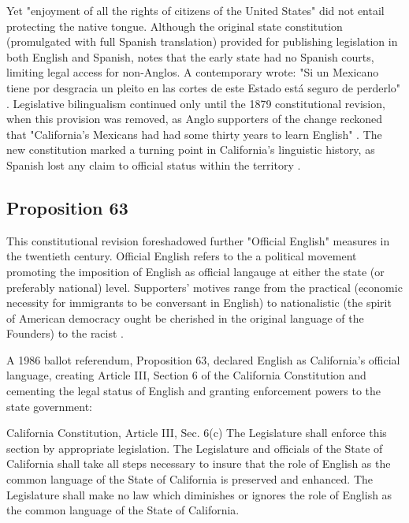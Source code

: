 Yet "enjoyment of all the rights of citizens of the United States" did not
entail protecting the native tongue. Although the original state constitution
(promulgated with full Spanish translation) provided for publishing legislation
in both English and Spanish, \textcite{lamar-prieto14} notes that the early
state had no Spanish courts, limiting legal access for non-Anglos. A
contemporary wrote: "Si un Mexicano tiene por desgracia un pleito en las cortes
de este Estado está seguro de perderlo" \parencite[28]{lamar-prieto14}.
Legislative bilingualism continued only until the 1879 constitutional revision,
when this provision was removed, as Anglo supporters of the change reckoned that
"California's Mexicans had had some thirty years to learn English"
\parencite{baron92}. The new constitution marked a turning point in California's
linguistic history, as Spanish lost any claim to official status within the
territory \parencite{baron92}.

\subsection{Proposition 63}

This constitutional revision foreshadowed further "Official English" measures in
the twentieth century. Official English refers to the a political movement
promoting the imposition of English as official langauge at either the state (or
preferably national) level. Supporters' motives range from the practical
(economic necessity for immigrants to be conversant in English) to nationalistic
(the spirit of American democracy ought be cherished in the original language of
the Founders) to the racist \parencite[7]{baron92}.

A 1986 ballot referendum, Proposition 63, declared English as California's
official language, creating Article III, Section 6 of the California
Constitution and cementing the legal status of English and granting enforcement
powers to the state government: 

\begin{aquote}{California Constitution, Article III, Sec. 6(c)}
	The Legislature shall enforce this section by appropriate legislation. The
	Legislature and officials of the State of California shall take all steps
	necessary to insure that the role of English as the common language of the
	State of California is preserved and enhanced. The Legislature shall make no
	law which diminishes or ignores the role of English as the common language of
	the State of California. \parencite{ca-const}
\end{aquote}

